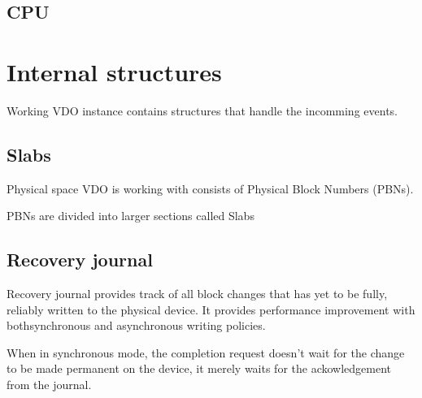\documentclass[
  color, %
  table, %
  lof,   %
  lot,   %
]{fithesis3}
\begin{document}




\subsection{CPU}

\section{Internal structures}
Working VDO instance contains structures that handle the incomming events.

\subsection{Slabs}

Physical space VDO is working with consists of Physical Block Numbers (PBNs).

PBNs are divided into larger sections called Slabs

\subsection{Recovery journal}
Recovery journal provides track of all block changes that has yet to be fully, reliably written to the physical device. It provides performance improvement with bothsynchronous and asynchronous writing policies.

When in synchronous mode, the completion request doesn't wait for the change to be made permanent on the device, it merely waits for the ackowledgement from the journal.
\end{document}
